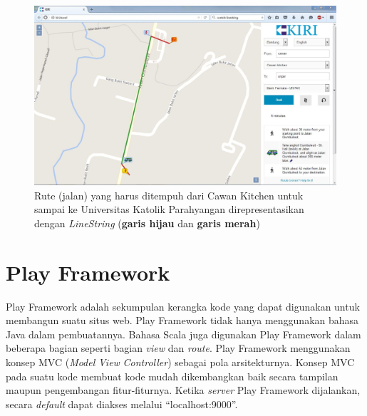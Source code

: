 \begin{figure}[htbp]
	\centering
		\includegraphics[scale=0.4]{Gambar/2_LineString.JPG}
	\caption{Rute (jalan) yang harus ditempuh dari Cawan Kitchen untuk sampai ke Universitas Katolik Parahyangan direpresentasikan dengan \textit{LineString} (\textbf{garis hijau} dan \textbf{garis merah})}
	\label{fig:2_linestring}
\end{figure}

\section{Play Framework}
\label{sec:play_framework}
Play Framework adalah sekumpulan kerangka kode yang dapat digunakan untuk membangun suatu situs web. Play Framework tidak hanya menggunakan bahasa Java dalam pembuatannya. Bahasa Scala juga digunakan Play Framework dalam beberapa bagian seperti bagian \textit{view} dan \textit{route}\cite{playforjava}. Play Framework menggunakan konsep MVC (\textit{Model} \textit{View} \textit{Controller}) sebagai pola arsitekturnya. Konsep MVC pada suatu kode membuat kode mudah dikembangkan baik secara tampilan maupun pengembangan fitur-fiturnya. Ketika \textit{server} Play Framework dijalankan, secara \textit{default} dapat diakses melalui ``localhost:9000''.

